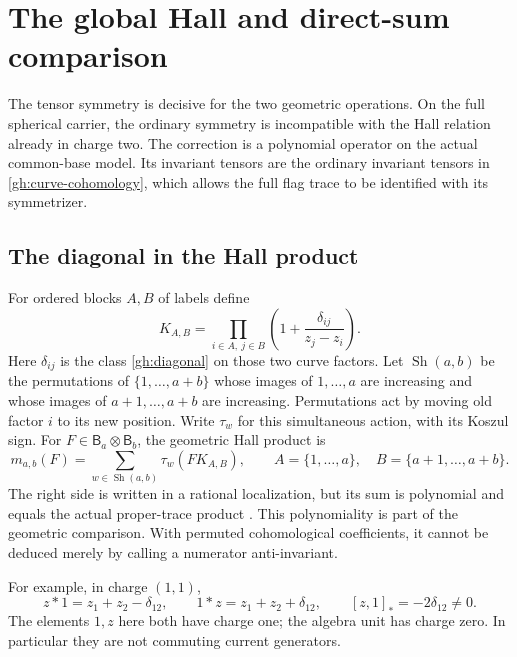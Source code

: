 \section{The global Hall and direct-sum comparison}
\label{sec:elliptic-hall-comparison}

The tensor symmetry is decisive for the two geometric operations.
On the full spherical carrier, the ordinary symmetry is incompatible
with the Hall relation already in charge two. The correction is a
polynomial operator on the actual common-base model. Its invariant
tensors are the ordinary invariant tensors in
\eqref{gh:curve-cohomology}, which allows the full flag trace to be
identified with its symmetrizer.

\subsection{The diagonal in the Hall product}

For ordered blocks $A,B$ of labels define
\[
 K_{A,B}=\prod_{i\in A,\ j\in B}
              \left(1+\frac{\delta_{ij}}{z_j-z_i}\right).
\]
Here $\delta_{ij}$ is the class \eqref{gh:diagonal} on those two
curve factors. Let $\operatorname{Sh}(a,b)$ be the permutations of
$\{1,\ldots,a+b\}$ whose images of $1,\ldots,a$ are increasing and
whose images of $a+1,\ldots,a+b$ are increasing.
Permutations act by moving old factor $i$ to its new position.
Write $\tau_w$ for this simultaneous action, with its Koszul sign.
For $F\in\mathsf B_a\otimes\mathsf B_b$, the geometric Hall product is
\begin{equation}\label{gh:kernel-product}
 m_{a,b}(F)=
 \sum_{w\in\operatorname{Sh}(a,b)}\tau_w(FK_{A,B}),
 \qquad A=\{1,\ldots,a\},\quad B=\{a+1,\ldots,a+b\}.
\end{equation}
The right side is written in a rational localization, but its sum
is polynomial and equals the actual proper-trace product
\cite[\S3.3]{JindalLim2026}.
This polynomiality is part of the geometric comparison. With
permuted cohomological coefficients, it cannot be deduced merely by
calling a numerator anti-invariant.

For example, in charge $(1,1)$,
\begin{equation}\label{gh:binary-products}
 z*1=z_1+z_2-\delta_{12},\qquad
 1*z=z_1+z_2+\delta_{12},\qquad
 [z,1]_*=-2\delta_{12}\ne0.
\end{equation}
The elements $1,z$ here both have charge one; the algebra unit has
charge zero. In particular they are not commuting current
generators.

